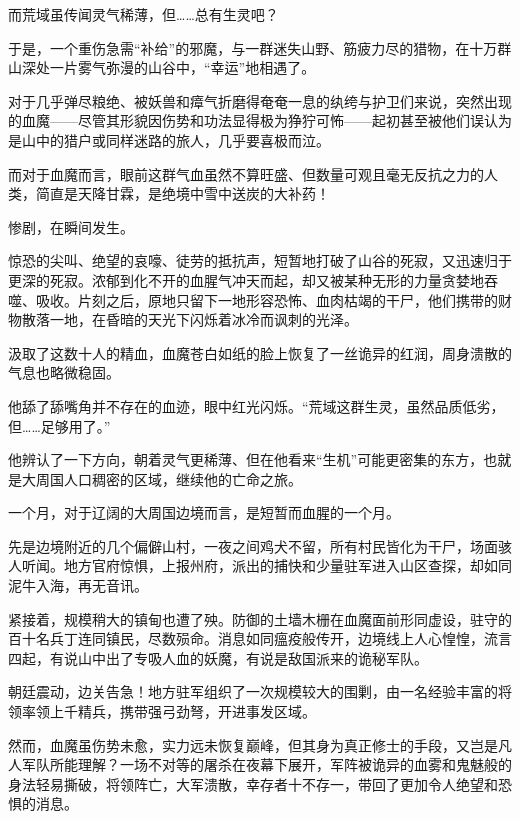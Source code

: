 而荒域虽传闻灵气稀薄，但……总有生灵吧？

\vspace{2em}

于是，一个重伤急需“补给”的邪魔，与一群迷失山野、筋疲力尽的猎物，在十万群山深处一片雾气弥漫的山谷中，“幸运”地相遇了。

\vspace{2em}

对于几乎弹尽粮绝、被妖兽和瘴气折磨得奄奄一息的纨绔与护卫们来说，突然出现的血魔——尽管其形貌因伤势和功法显得极为狰狞可怖——起初甚至被他们误认为是山中的猎户或同样迷路的旅人，几乎要喜极而泣。

而对于血魔而言，眼前这群气血虽然不算旺盛、但数量可观且毫无反抗之力的人类，简直是天降甘霖，是绝境中雪中送炭的大补药！

\vspace{2em}

惨剧，在瞬间发生。

惊恐的尖叫、绝望的哀嚎、徒劳的抵抗声，短暂地打破了山谷的死寂，又迅速归于更深的死寂。浓郁到化不开的血腥气冲天而起，却又被某种无形的力量贪婪地吞噬、吸收。片刻之后，原地只留下一地形容恐怖、血肉枯竭的干尸，他们携带的财物散落一地，在昏暗的天光下闪烁着冰冷而讽刺的光泽。

汲取了这数十人的精血，血魔苍白如纸的脸上恢复了一丝诡异的红润，周身溃散的气息也略微稳固。

他舔了舔嘴角并不存在的血迹，眼中红光闪烁。“荒域这群生灵，虽然品质低劣，但……足够用了。”

他辨认了一下方向，朝着灵气更稀薄、但在他看来“生机”可能更密集的东方，也就是大周国人口稠密的区域，继续他的亡命之旅。

\vspace{2em}

一个月，对于辽阔的大周国边境而言，是短暂而血腥的一个月。

先是边境附近的几个偏僻山村，一夜之间鸡犬不留，所有村民皆化为干尸，场面骇人听闻。地方官府惊惧，上报州府，派出的捕快和少量驻军进入山区查探，却如同泥牛入海，再无音讯。

紧接着，规模稍大的镇甸也遭了殃。防御的土墙木栅在血魔面前形同虚设，驻守的百十名兵丁连同镇民，尽数殒命。消息如同瘟疫般传开，边境线上人心惶惶，流言四起，有说山中出了专吸人血的妖魔，有说是敌国派来的诡秘军队。

朝廷震动，边关告急！地方驻军组织了一次规模较大的围剿，由一名经验丰富的将领率领上千精兵，携带强弓劲弩，开进事发区域。

然而，血魔虽伤势未愈，实力远未恢复巅峰，但其身为真正修士的手段，又岂是凡人军队所能理解？一场不对等的屠杀在夜幕下展开，军阵被诡异的血雾和鬼魅般的身法轻易撕破，将领阵亡，大军溃散，幸存者十不存一，带回了更加令人绝望和恐惧的消息。

